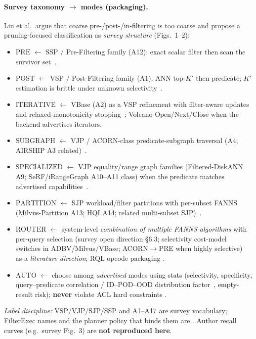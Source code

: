 \paragraph{Survey taxonomy $\rightarrow$ modes (packaging).}
Lin et al.\ argue that coarse pre-/post-/in-filtering is too coarse and propose a pruning-focused classification \established{} as \emph{survey structure} (Figs.~1--2):
\begin{itemize}
  \item $\mathrm{PRE}$ $\leftarrow$ SSP / Pre-Filtering family (A12): exact scalar filter then scan the survivor set~\citep{lin2025fanns}.
  \item $\mathrm{POST}$ $\leftarrow$ VSP / Post-Filtering family (A1): ANN top-$K'$ then predicate; $K'$ estimation is brittle under unknown selectivity~\citep{lin2025fanns,patel2024acorn}.
  \item $\mathrm{ITERATIVE}$ $\leftarrow$ VBase (A2) as a VSP refinement with filter-aware updates and relaxed-monotonicity stopping~\citep{lin2025fanns,zhang2023vbase}; Volcano $\mathrm{Open}/\mathrm{Next}/\mathrm{Close}$ when the backend advertises iterators.
  \item $\mathrm{SUBGRAPH}$ $\leftarrow$ VJP / ACORN-class predicate-subgraph traversal (A4; AIRSHIP A3 related)~\citep{lin2025fanns,patel2024acorn}.
  \item $\mathrm{SPECIALIZED}$ $\leftarrow$ VJP equality/range graph families (Filtered-DiskANN A9; SeRF/iRangeGraph A10--A11 class) when the predicate matches advertised capabilities~\citep{lin2025fanns,gollapudi2023filtered}.
  \item $\mathrm{PARTITION}$ $\leftarrow$ SJP workload/filter partitions with per-subset FANNS (Milvus-Partition A13; HQI A14; related multi-subset SJP)~\citep{lin2025fanns}.
  \item $\mathrm{ROUTER}$ $\leftarrow$ system-level \emph{combination of multiple FANNS algorithms} with per-query selection (survey open direction \S6.3; selectivity cost-model switches in ADBV/Milvus/VBase; ACORN$\rightarrow$PRE when highly selective)~\citep{lin2025fanns} \established{} as a \emph{literature direction}; RQL opcode packaging \hypothesis{}.
  \item $\mathrm{AUTO}$ $\leftarrow$ choose among \emph{advertised} modes using stats (selectivity, specificity, query--predicate correlation / ID--POD--OOD distribution factor~\citep{lin2025fanns}, empty-result risk); \textbf{never} violate ACL hard constraints \hypothesis{}.
\end{itemize}
\noindent\textit{Label discipline:} VSP/VJP/SJP/SSP and A1--A17 are \established{} survey vocabulary; FilterExec names and the planner policy that binds them are \hypothesis{}.
Author recall curves (e.g.\ survey Fig.~3) are \textbf{not reproduced here}.

